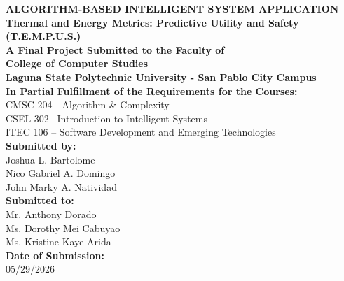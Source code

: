 \documentclass[12pt]{article}
\begin{document}
\begin{titlepage}
    \centering

    {\Large \textbf{ALGORITHM-BASED INTELLIGENT SYSTEM APPLICATION}}\\[1cm]
    {\large \textbf{Thermal and Energy Metrics: Predictive Utility and Safety (T.E.M.P.U.S.)}}\\[2cm]

    \textbf{A Final Project Submitted to the Faculty of}\\
    \textbf{College of Computer Studies}\\
    \textbf{Laguna State Polytechnic University - San Pablo City Campus}\\[1.5cm]

    \textbf{In Partial Fulfillment of the Requirements for the Courses:}\\
    CMSC 204 - Algorithm \& Complexity\\
    CSEL 302-- Introduction to Intelligent Systems\\
    ITEC 106 -- Software Development and Emerging Technologies\\[2cm]

    \textbf{Submitted by:}\\[0.3cm]
    Joshua L. Bartolome\\
    Nico Gabriel A. Domingo\\
    John Marky A. Natividad\\[2cm]

    \textbf{Submitted to:}\\[0.3cm]
    Mr. Anthony Dorado\\
    Ms. Dorothy Mei Cabuyao\\
    Ms. Kristine Kaye Arida\\[2cm]

    \textbf{Date of Submission:}\\
    05/29/2026

    \vfill

\end{titlepage}

\newpage
\setcounter{page}{2}

\end{document}
